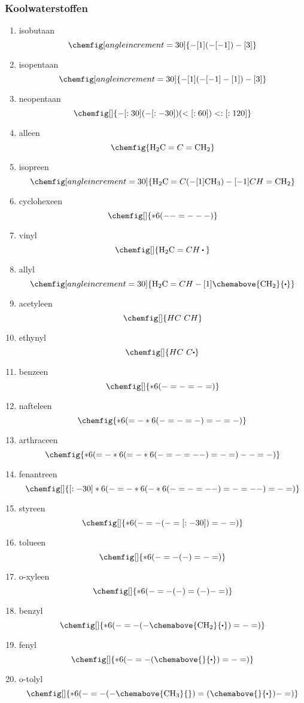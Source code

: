 \documentclass[a4paper,12pt]{article}
\begin{document}
    \subsubsection{Koolwaterstoffen}
    \begin{enumerate}
        \item isobutaan $$\chemfig[angle increment=30]{-[1](-[-1])-[3]}$$
        \item isopentaan $$\chemfig[angle increment=30]{-[1](-[-1]-[1])-[3]}$$
        \item neopentaan $$\chemfig[]{-[:30](-[:-30])(<[:60])<:[:120]}$$
        \item alleen $$\chemfig{\ce{H2C}=C=\ce{CH2}}$$
        \item isopreen $$\chemfig[angle increment=30]{\ce{H2C}=C(-[1]\ce{CH3})-[-1]CH=\ce{CH2}}$$
        \item cyclohexeen $$\chemfig[]{*6(--=---)}$$
        \item vinyl $$\chemfig[]{\ce{H2C}=CH\bigcdot{}}$$
        \item allyl $$\chemfig[angle increment=30]{\ce{H2C}=CH-[1]\chemabove{\ce{CH2}}{\bigcdot}}$$
        \item acetyleen $$\chemfig[]{HC~CH}$$
        \item ethynyl $$\chemfig[]{HC~C\bigcdot}$$
        \item benzeen $$\chemfig[]{*6(-=-=-=)}$$
        \item nafteleen $$\chemfig{*6(=-*6(-=-=-)=-=-)}$$
        \item arthraceen $$\chemfig{*6(=-*6(=-*6(-=-=--)=-=)--=-)}$$
        \item fenantreen $$\chemfig[]{[:-30]*6(-=-*6(-*6(-=-=--)=-=--)=-=)}$$
        \item styreen $$\chemfig[]{*6(-=-(-=[:-30])=-=)}$$
        \item tolueen $$\chemfig[]{*6(-=-(-)=-=)}$$
        \item o-xyleen $$\chemfig[]{*6(-=-(-)=(-)-=)}$$
        \item benzyl $$\chemfig[]{*6(-=-(-\chemabove{\ce{CH2}}{\bigcdot{}})=-=)}$$
        \item fenyl $$\chemfig[]{*6(-=-(\chemabove{}{\bigcdot{}})=-=)}$$
        \item o-tolyl $$\chemfig[]{*6(-=-(-\chemabove{\ce{CH3}}{})=(\chemabove{}{\bigcdot{}})-=)}$$
    \end{enumerate}
\end{document}
